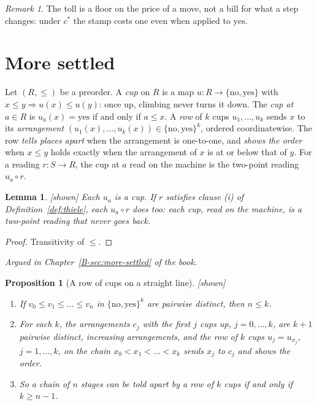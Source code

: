 \documentclass[11pt, a4paper]{article}
\theoremstyle{plain}
\newtheorem{proposition}[theorem]{Proposition}
\newtheorem{lemma}[theorem]{Lemma}
\theoremstyle{definition}
\theoremstyle{remark}
\newtheorem{remark}[theorem]{Remark}
\newcommand{\Bool}{\{\mathrm{no},\mathrm{yes}\}}
\newcommand{\cost}{c}
\newcommand{\rd}{r}
\newcommand{\argued}[1]{\par\noindent\textit{Argued in Chapter~\ref{B-#1} of the book.}\par}
\newcommand{\kind}[1]{\textup{[#1]}}
\begin{document}
\begin{remark}
The toll is a floor on the price of a move, not a bill for what a step changes: under $\cost^*$ the
stamp costs one even when applied to $\mathrm{yes}$.
\end{remark}

\section{More settled}\label{spec:ch05}

Let $(R,\le)$ be a preorder. A \emph{cup} on $R$ is a map $u:R\to\Bool$ with $x\le y\Rightarrow
u(x)\le u(y)$: once up, climbing never turns it down. The \emph{cup at} $a\in R$ is
$u_a(x)=\mathrm{yes}$ if and only if $a\le x$. A \emph{row} of $k$ cups $u_1,\dots,u_k$ sends $x$ to its
\emph{arrangement} $(u_1(x),\dots,u_k(x))\in\Bool^k$, ordered coordinatewise. The row \emph{tells places
apart} when the arrangement is one-to-one, and \emph{shows the order} when $x\le y$ holds exactly when the
arrangement of $x$ is at or below that of $y$. For a reading $\rd:S\to R$, the cup at $a$ read on the
machine is the two-point reading $u_a\circ\rd$.

\begin{lemma}\label{spec:cup-latch} \kind{shown}
Each $u_a$ is a cup. If $\rd$ satisfies clause (i) of Definition~\ref{def:thiele}, each $u_a\circ\rd$
does too: each cup, read on the machine, is a two-point reading that never goes back.
\end{lemma}

\begin{proof}
Transitivity of $\le$.
\end{proof}

\argued{sec:more-settled}

\begin{proposition}[A row of cups on a straight line]\label{spec:row-cups} \kind{shown}
\begin{enumerate}[label=(\alph*)]
\item If $v_0\le v_1\le\dots\le v_n$ in $\Bool^k$ are pairwise distinct, then $n\le k$.
\item For each $k$, the arrangements $c_j$ with the first $j$ cups up, $j=0,\dots,k$, are $k+1$ pairwise
distinct, increasing arrangements, and the row of $k$ cups $u_j=u_{x_j}$, $j=1,\dots,k$, on the chain
$x_0<x_1<\dots<x_k$ sends $x_j$ to $c_j$ and shows the order.
\item So a chain of $n$ stages can be told apart by a row of $k$ cups if and only if $k\ge n-1$.
\end{enumerate}
\end{proposition}
\end{document}
